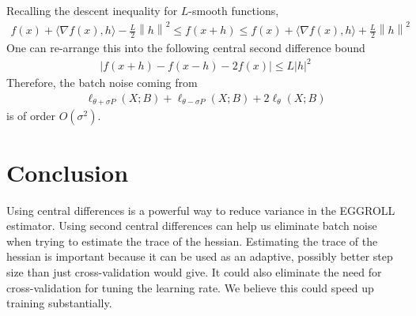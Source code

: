 \documentclass[twoside,11pt]{article}
\newcommand{\mg}[1]{\left \| #1 \right\|}
\renewcommand{\grad}{\nabla}
\newcommand{\1}{\mathbbm{1}}
\begin{document}
Recalling the descent inequality for $L$-smooth functions,
\begin{align*}
    f(x) + \langle \grad f(x), h \rangle - \frac{L}{2} \mg{h}^2 \leq f(x+h) \leq f(x) + \langle \grad f(x), h \rangle + \frac{L}{2} \mg{h}^2
\end{align*}
One can re-arrange this into the following central second difference bound
\begin{align*}
    |f(x+h) - f(x-h) - 2f(x)| \leq L |h|^2
\end{align*}
Therefore, the batch noise coming from
\begin{align*}
    \ell_{\theta + \sigma P}(X ; B) + \ell_{\theta - \sigma P}(X ; B) + 2 \ell_{\theta}(X ; B)
\end{align*}
is of order $O(\sigma^2)$. 
\section{Conclusion}
Using central differences is a powerful way to reduce variance in the EGGROLL estimator. Using second central differences can help us eliminate batch noise when trying to estimate the trace of the hessian. Estimating the trace of the hessian is important because it can be used as an adaptive, possibly better step size than just cross-validation would give. It could also eliminate the need for cross-validation for tuning the learning rate. We believe this could speed up training substantially. 
\end{document}
